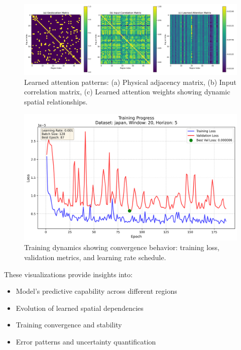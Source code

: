 \documentclass[lettersize, journal]{IEEEtran}
\begin{document}
\begin{figure}[h]
    \centering
    \includegraphics[width=\textwidth]{../figures/matrices_japan.w-20.h-5.png}
    \caption{Learned attention patterns: (a) Physical adjacency matrix, (b) Input correlation matrix, (c) Learned attention weights showing dynamic spatial relationships.}
    \label{fig:attention_vis}
\end{figure}

\begin{figure}[h]
    \centering
    \includegraphics[width=\columnwidth]{../figures/loss_curve_japan.w-20.h-5.png}
    \caption{Training dynamics showing convergence behavior: training loss, validation metrics, and learning rate schedule.}
    \label{fig:training_curves}
\end{figure}

These visualizations provide insights into:
\begin{itemize}
    \item Model's predictive capability across different regions
    \item Evolution of learned spatial dependencies
    \item Training convergence and stability
    \item Error patterns and uncertainty quantification
\end{itemize}
\end{document}
